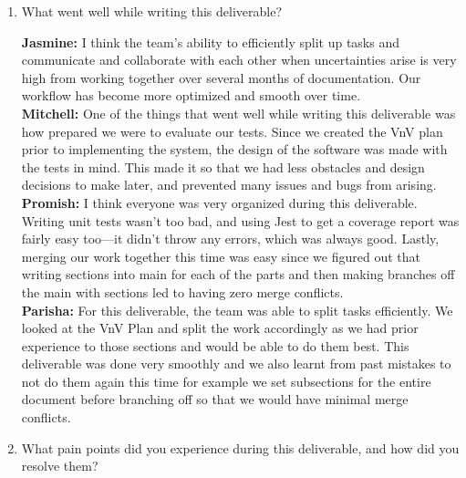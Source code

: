 \documentclass[12pt, titlepage]{article}
\begin{document}
\begin{enumerate}
  \item What went well while writing this deliverable? 
  
  \textbf{Jasmine:} I think the team's ability to efficiently split up tasks and communicate and collaborate with each other when uncertainties arise is very high from working together over several months of documentation. Our workflow has become more optimized and smooth over time.\\
  \textbf{Mitchell:} One of the things that went well while writing this deliverable was how prepared we were to evaluate our tests. Since we created the VnV plan prior to implementing the system, the design of the software was made with the tests in mind. This made it so that we had less obstacles and design decisions to make later, and prevented many issues and bugs from arising.\\
  \textbf{Promish:} I think everyone was very organized during this deliverable. Writing unit tests wasn’t too bad, and using Jest to get a coverage report was fairly easy too—it didn’t throw any errors, which was always good. Lastly, merging our work together this time was easy since we figured out that writing sections into main for each of the parts and then making branches off the main with sections led to having zero merge conflicts.\\
  \textbf{Parisha:} For this deliverable, the team was able to split tasks efficiently. We looked at the VnV Plan and split the work accordingly as we had prior experience to those sections and would be able to do them best. This deliverable was done very smoothly and we also learnt from past mistakes to not do them again this time for example we set subsections for the entire document before branching off so that we would have minimal merge conflicts. \\

  \item What pain points did you experience during this deliverable, and how
    did you resolve them?
  

\end{enumerate}
\end{document}
